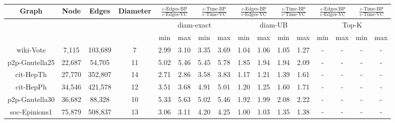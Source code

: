 \begin{table*}[ht]
\centering %
\begin{tabular}{|c c c c | c c | c c | c c | c c | c c | c c|} %
\hline\hline %
Graph & Node & Edges & Diameter  & \multicolumn{2}{|c|}{$\frac{\varepsilon\mbox{-Edges-BP}}{ \varepsilon\mbox{-Edges-VC}}$} & \multicolumn{2}{c|}{$\frac{\varepsilon\mbox{-Time-BP}}{\varepsilon\mbox{-Time-VC}}$} & \multicolumn{2}{c|}{$\frac{\varepsilon\mbox{-Edges-BP}}{ \varepsilon\mbox{-Edges-VC}}$} & \multicolumn{2}{c|}{$\frac{\varepsilon\mbox{-Time-BP}}{\varepsilon\mbox{-Time-VC}}$} & \multicolumn{2}{c|}{$\frac{\varepsilon\mbox{-Edges-BP}}{ \varepsilon\mbox{-Edges-VC}}$} & \multicolumn{2}{c|}{$\frac{\varepsilon\mbox{-Time-BP}}{\varepsilon\mbox{-Time-VC}}$}\\ [0.5ex] %
\hline
&  &  & &\multicolumn{4}{|c|}{diam-exact}  &  \multicolumn{4}{c|}{diam-UB} & \multicolumn{4}{c|}{Top-K}\\
\hline %
&  &  & &min & max & min & max&min & max & min & max &min & max & min & max\\
\hline %
wiki-Vote & 7,115 & 103,689  & 7 & 2.99 & 3.10 & 3.35 & 3.69 & 1.04 & 1.06 &1.05 & 1.27 & - & - & - & -\\
p2p-Gnutella25 & 22,687 & 54,705 & 11 & 5.02 & 5.46 & 5.45 & 5.78 & 1.85& 1.94& 1.94 & 2.09 & - & - & - &-\\
cit-HepTh & 27,770 & 352,807 & 14  & 2.71 & 2.86 & 3.58 & 3.83 & 1.17 & 1.21 & 1.39 & 1.61 & - & -  & - & -\\
cit-HepPh & 34,546 & 421,578 & 12 & 3.51 & 3.68 & 4.91 & 5.01 & 1.20 & 1.25& 1.60 & 1.71 & - & -  &-  &-\\ %
p2p-Gnutella30 & 36,682 & 88,328 & 10  & 5.33 & 5.63 & 5.02 & 5.46 & 1.92 & 1.99 & 2.08 & 2.22 & - & - & - & -\\
soc-Epinions1 & 75,879 & 508,837 & 13  & 3.06&  3.11 & 4.20 & 4.25 & 1.00 & 1.03 & 1.35 & 1.38 & - &  - & - & -\\ [1ex] %
\hline %
\end{tabular}
\caption{\XXX
}
\label{tab:expDir} %
\end{table*}
